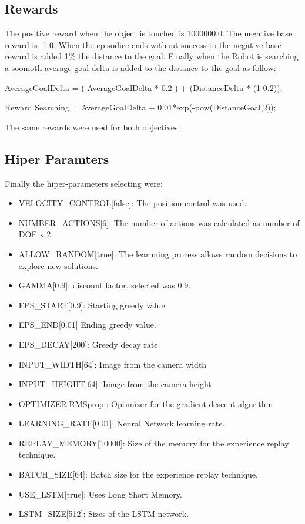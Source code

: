 \documentclass[10pt,journal,compsoc]{IEEEtran}
\begin{document}
\subsection{Rewards}

The positive reward when the object is touched is 1000000.0. The negative base reward is -1.0. When the episodice ends without success to the negative base reward is added 1\% the distance to the goal. Finally when the Robot is searching a soomoth average goal delta is added to the distance to the goal as follow:

AverageGoalDelta  = ( AverageGoalDelta * 0.2 ) + (DistanceDelta * (1-0.2));

Reward Searching  = AverageGoalDelta + 0.01*exp(-pow(DistanceGoal,2));

The same rewards were used for both objectives. 

\subsection{Hiper Paramters}

Finally the hiper-parameters selecting were:

\begin{itemize}
\item  VELOCITY\_CONTROL[false]: The position control was used.
\item  NUMBER\_ACTIONS[6]: The number of actions was calculated as number of DOF x 2.
\item  ALLOW\_RANDOM[true]: The learnning process allows random decisions to explore new solutions.
\item  GAMMA[0.9]: discount factor, selected was 0.9.
\item  EPS\_START[0.9]: Starting greedy value.
\item  EPS\_END[0.01] Ending greedy value.
\item  EPS\_DECAY[200]: Greedy decay rate
\item  INPUT\_WIDTH[64]: Image from the camera width
\item  INPUT\_HEIGHT[64]: Image from the camera height
\item  OPTIMIZER[RMSprop]: Optimizer for the gradient descent algorithm 
\item  LEARNING\_RATE[0.01]: Neural Network learning rate.
\item  REPLAY\_MEMORY[10000]: Size of the memory for the experience replay technique.
\item  BATCH\_SIZE[64]: Batch size for the experience replay technique.
\item  USE\_LSTM[true]: Uses Long Short Memory.
\item  LSTM\_SIZE[512]: Sizes of the LSTM network.
\end{itemize}
\end{document}
